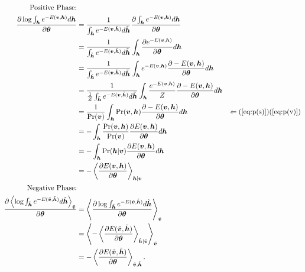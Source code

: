 \documentclass[11pt]{article}
\newcommand{\mean}[2]{\left\langle{#1}\right\rangle_{#2}}
\newcommand{\vh}{\boldsymbol{h}}
\newcommand{\vv}{\boldsymbol{v}}
\newcommand{\vht}{\tilde{\vh}}
\newcommand{\vvt}{\tilde{\vv}}
\newcommand{\pEC}{\boldsymbol{\theta}}
\newcommand{\PDV}[2]{\frac{\partial #1}{\partial #2}}
\begin{document}
\begin{align*}
  \textrm{Positive Phase:}
  & \\
  \PDV{\log{\int_{\vh}{e^{-E(\vv, \vh)}d\vh}}}{\pEC} 
  & = \frac{1}{\int_{\vht} e^{-E(\vv, \vht)} d\vht}   \PDV{\int_{\vh} e^{-E(\vv, \vh)} d\vh}{\pEC}  \\
  & = \frac{1}{\int_{\vht} e^{-E(\vv, \vht)} d\vht}   \int_{\vh} \PDV{ e^{-E(\vv, \vh)}}{\pEC} d\vh \\
  & = \frac{1}{\int_{\vht} e^{-E(\vv, \vht)} d\vht}   \int_{\vh} e^{-E(\vv, \vh)}\PDV{-E(\vv, \vh)}{\pEC} d\vh \\
  & = \frac{1}{ \frac{1}{Z}  \int_{\vht} e^{-E(\vv, \vht)} d\vht}  \int_{\vh} \frac{e^{-E(\vv, \vh)}}{Z} \PDV{-E(\vv, \vh)}{\pEC} d\vh \\
  & = \frac{1}{\Pr(\vv)}  \int_{\vh} \Pr(\vv, \vh)\PDV{-E(\vv, \vh)}{\pEC} d\vh  & \Leftarrow (\ref{eq:p(s)})(\ref{eq:p(v)}) \\
  & = -\int_{\vh} \frac{\Pr(\vv, \vh)}{\Pr(\vv)} \PDV{E(\vv, \vh)}{\pEC} d\vh \\
  & = -\int_{\vh} \Pr(\vh | \vv) \PDV{E(\vv, \vh)}{\pEC}  d\vh \\
  & = -\mean{\PDV{E(\vv, \vh)}{\pEC}}{\vh|\vv} \\
  \textrm{Negative Phase:}
  & \\
  \PDV{\mean{\log{\int_{\vht}{e^{-E(\vvt, \vht)}d\vht}}}{\vvt}}{\pEC}
  &= \mean{\PDV{\log{\int_{\vht}{e^{-E(\vvt, \vht)}d\vht}}}{\pEC}}{\vvt} \\
  &= \mean{ -\mean{\PDV{E(\vvt, \vht)}{\pEC}}{\vht|\vvt}  }{\vvt} \\
  &= -\mean{\PDV{E(\vvt, \vht)}{\pEC}}{\vvt, \vht}.
\end{align*} 
\end{document}
